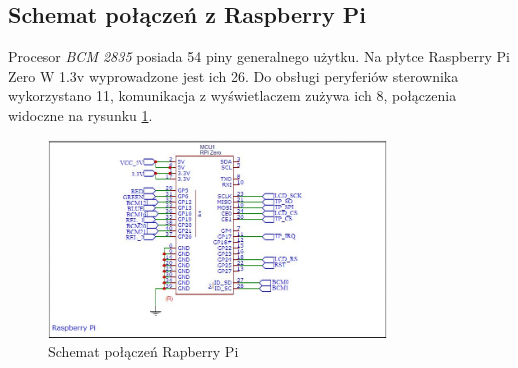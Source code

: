 \documentclass[12pt, eng, twoside, openany, final]{mgr}
\begin{document}
    \newpage
        \subsection{Schemat połączeń z Raspberry Pi}
        Procesor \emph{BCM 2835} posiada 54 piny generalnego użytku\cite{RpiData}. Na płytce Raspberry Pi Zero W 1.3v wyprowadzone jest ich 26. Do obsługi peryferiów sterownika wykorzystano 11, komunikacja z wyświetlaczem zużywa ich 8, połączenia widoczne na rysunku \ref{fig:rpi_schm}.
            \begin{figure}[H]
            \begin{center}
                \includegraphics[width=0.8\textwidth]{rpi_schm.jpg}
                \caption{Schemat połączeń Rapberry Pi} \label{fig:rpi_schm} 
            \end{center}
            \end{figure}
        
\end{document}
